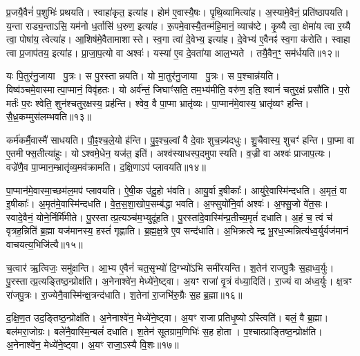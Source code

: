 प्र॒जयै॒वैनं॑ प॒शुभिः॑ प्रथयति।
स्वाहा॑कृत॒ इत्या॑ह।
होम॑ ए॒वास्यै॒षः।
पृ॒थि॒व्यामित्या॑ह।
अ॒स्यामे॒वैनं॒ प्रति॑ष्ठापयति।
य॒न्ता राड्य॒न्ताऽसि॒ यम॑नो ध॒र्तासि॑ ध॒रुण॒ इत्या॑ह।
रू॒पमे॒वास्यै॒तन्म॑हि॒मानं॒ व्याच॑ष्टे।
कृ॒ष्यै त्वा॒ क्षेमा॑य त्वा र॒य्यै त्वा॒ पोषा॑य॒ त्वेत्या॑ह।
आ॒शिष॑मे॒वैतामाशास्ते।
स्व॒गा त्वा॑ दे॒वेभ्य॒ इत्या॑ह।
दे॒वेभ्य॑ ए॒वैनꣴ॑ स्व॒गा क॑रोति।
स्वाहा त्वा प्र॒जाप॑तय॒ इत्या॑ह।
प्रा॒जा॒प॒त्यो वा अश्वः॑।
यस्या॑ ए॒व दे॒वता॑या आल॒भ्यते।
तयै॒वैन॒ꣳ॒ सम॑र्धयति॥१२॥\anuvakamend[ब॒ध्ना॒ति॒ समृ॑द्ध्या उ॒पाद॑धात्य॒सीत्या॑ह॒ सप्र॑थस॒मित्या॑ह दे॒वेभ्य॒ इत्या॑ह॒ पञ्च॑ च]

यः पि॒तुर॑नु॒जाया पु॒त्रः।
स पु॒रस्तान्नयति।
यो मा॒तुर॑नु॒जाया पु॒त्रः।
स प॒श्चान्न॑यति।
विष्व॑ञ्चमे॒वास्मात्पा॒प्मानं॒ विवृ॑हतः।
यो अर्व॑न्तं॒ जिघाꣳ॑सति॒ तम॒भ्य॑मीति॒ वरु॑ण॒ इति॒ श्वानं॑ चतुर॒क्षं प्रसौ॑ति।
प॒रो मर्तः॑ प॒रः श्वेति॒ शुन॑श्चतुर॒क्षस्य॒ प्रह॑न्ति।
श्वेव॒ वै पा॒प्मा भ्रातृ॑व्यः।
पा॒प्मान॑मे॒वास्य॒ भ्रातृ॑व्यꣳ हन्ति।
सै॒ध्र॒कम्मुस॑लम्भवति॥१३॥

कर्म॑कर्मै॒वास्मै॑ साधयति।
पौ॒ꣴ॒श्च॒ले॒यो ह॑न्ति।
पु॒ꣴ॒श्च॒ल्वां वै दे॒वाः शुच॒न्न्य॑दधुः।
शु॒चैवास्य॒ शुचꣳ॑ हन्ति।
पा॒प्मा वा ए॒तमीफ्स॒तीत्या॑हुः।
योऽश्वमे॒धेन॒ यज॑त॒ इति॑।
अश्व॑स्याधस्प॒दमुपास्यति।
व॒ज्री वा अश्वः॑ प्राजाप॒त्यः।
वज्रे॑णै॒व पा॒प्मान॒म्भ्रातृ॑व्य॒मव॑\-क्रामति।
द॒क्षि॒णाऽप॑ प्लावयति॥१४॥

पा॒प्मान॑मे॒वास्मा॒च्छम॑ल॒मप॑ प्लावयति।
ऐ॒षी॒क उ॑दू॒हो भ॑वति।
आयु॒र्वा इ॒षीकाः᳚।
आयु॑रे॒वास्मि॑न्दधति।
अ॒मृतं॒ वा इ॒षीकाः᳚।
अ॒मृत॑मे॒वास्मि॑न्दधति।
वे॒त॒स॒शा॒खोप॒सम्ब॑द्धा भवति।
अ॒फ्सुयो॑नि॒र्वा अश्वः॑।
अ॒फ्सु॒जो वे॑त॒सः।
स्वादे॒वैनं॒ योने॒र्निर्मि॑मीते।
पु॒रस्तात्प्र॒त्यञ्च॑म॒भ्युदू॑हति।
पु॒रस्ता॑दे॒वास्मि॑न्प्र॒तीच्य॒मृतं॑ दधाति।
अ॒हं च॒ त्वं च॑ वृत्रह॒न्निति॑ ब्र॒ह्मा यज॑मानस्य॒ हस्तं॑ गृह्णाति।
ब्र॒ह्म॒क्ष॒त्रे ए॒व सन्द॑धाति।
अ॒भिक्रत्वेन्द्र भू॒रध॒ज्मन्नित्य॑ध्व॒र्युर्यज॑मानं वाचयत्य॒भिजि॑त्यै॥१५॥\anuvakamend[भ॒व॒ति॒ प्ला॒व॒य॒ति॒ मि॒मी॒ते॒ पञ्च॑ च]

च॒त्वार॑ ऋ॒त्विजः॒ समु॑क्षन्ति।
आ॒भ्य ए॒वैनं॑ चत॒सृभ्यो॑ दि॒ग्भ्यो॑ऽभि समी॑रयन्ति।
श॒तेन॑ राजपु॒त्रैः स॒हाध्व॒र्युः।
पु॒रस्तात्प्र॒त्यङ्तिष्ठ॒न्प्रोक्ष॑ति।
अ॒नेनाश्वे॑न॒ मेध्ये॑ने॒ष्ट्वा।
अ॒यꣳ राजा॑ वृ॒त्रं व॑ध्या॒दिति॑।
रा॒ज्यं वा अ॑ध्व॒र्युः।
क्ष॒त्रꣳ रा॑जपु॒त्रः।
रा॒ज्येनै॒वास्मि॑न्क्ष॒त्रन्द॑धाति।
श॒तेना॑ रा॒जभि॑रु॒ग्रैः स॒ह ब्र॒ह्मा॥१६॥

द॒क्षि॒ण॒त उद॒ङ्तिष्ठ॒न्प्रोक्ष॑ति।
अ॒नेनाश्वे॑न॒ मेध्ये॑ने॒ष्ट्वा।
अ॒यꣳ राजाप्रतिधृ॒ष्यो\-ऽस्त्विति॑।
बलं॒ वै ब्र॒ह्मा।
बल॑मरा॒जोग्रः।
बले॑नै॒वास्मि॒न्बलं॑ दधाति।
श॒तेन॑ सूतग्राम॒णिभिः॑ स॒ह होता।
प॒श्चात्प्राङ्तिष्ठ॒न्प्रोक्ष॑ति।
अ॒नेनाश्वे॑न॒ मेध्ये॑ने॒ष्ट्वा।
अ॒यꣳ राजा॒\-ऽस्यै वि॒शः॥१७॥


